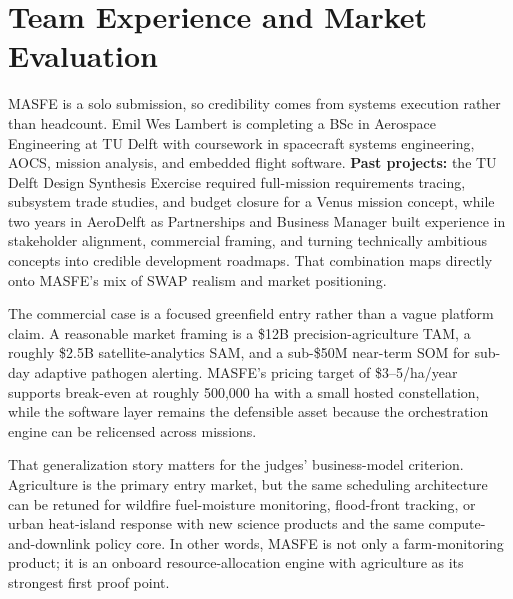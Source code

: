 \section{Team Experience and Market Evaluation}

MASFE is a solo submission, so credibility comes from systems execution rather than headcount. Emil Wes Lambert is completing a BSc in Aerospace Engineering at TU Delft with coursework in spacecraft systems engineering, AOCS, mission analysis, and embedded flight software. \textbf{Past projects:} the TU Delft Design Synthesis Exercise required full-mission requirements tracing, subsystem trade studies, and budget closure for a Venus mission concept, while two years in AeroDelft as Partnerships and Business Manager built experience in stakeholder alignment, commercial framing, and turning technically ambitious concepts into credible development roadmaps. That combination maps directly onto MASFE's mix of SWAP realism and market positioning.

The commercial case is a focused greenfield entry rather than a vague platform claim. A reasonable market framing is a \$12B precision-agriculture TAM, a roughly \$2.5B satellite-analytics SAM, and a sub-\$50M near-term SOM for sub-day adaptive pathogen alerting. MASFE's pricing target of \$3--5/ha/year supports break-even at roughly 500,000 ha with a small hosted constellation, while the software layer remains the defensible asset because the orchestration engine can be relicensed across missions.

That generalization story matters for the judges' business-model criterion. Agriculture is the primary entry market, but the same scheduling architecture can be retuned for wildfire fuel-moisture monitoring, flood-front tracking, or urban heat-island response with new science products and the same compute-and-downlink policy core. In other words, MASFE is not only a farm-monitoring product; it is an onboard resource-allocation engine with agriculture as its strongest first proof point.
